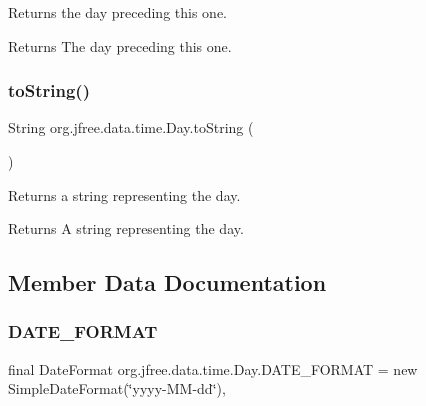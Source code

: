 Returns the day preceding this one.

\begin{DoxyReturn}{Returns}
The day preceding this one. 
\end{DoxyReturn}
\mbox{\label{classorg_1_1jfree_1_1data_1_1time_1_1_day_af4317639b59d575a4f86c4effac08e55}} 
\subsubsection{\texorpdfstring{to\+String()}{toString()}}
{\footnotesize\ttfamily String org.\+jfree.\+data.\+time.\+Day.\+to\+String (\begin{DoxyParamCaption}{ }\end{DoxyParamCaption})}

Returns a string representing the day.

\begin{DoxyReturn}{Returns}
A string representing the day. 
\end{DoxyReturn}


\subsection{Member Data Documentation}
\mbox{\label{classorg_1_1jfree_1_1data_1_1time_1_1_day_aff816abd46d5f7b2da31d795478c0f97}} 
\subsubsection{\texorpdfstring{D\+A\+T\+E\+\_\+\+F\+O\+R\+M\+AT}{DATE\_FORMAT}}
{\footnotesize\ttfamily final Date\+Format org.\+jfree.\+data.\+time.\+Day.\+D\+A\+T\+E\+\_\+\+F\+O\+R\+M\+AT = new Simple\+Date\+Format(\char`\"{}yyyy-\/MM-\/dd\char`\"{})\hspace{0.3cm}{\ttfamily [static]}, {\ttfamily [protected]}}

